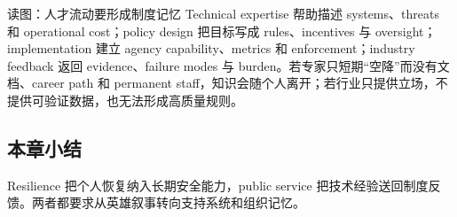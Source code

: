 
\begin{knowledgebox}{读图：人才流动要形成制度记忆}
Technical expertise 帮助描述 systems、threats 和 operational cost；policy design 把目标写成 rules、incentives 与 oversight；implementation 建立 agency capability、metrics 和 enforcement；industry feedback 返回 evidence、failure modes 与 burden。若专家只短期“空降”而没有文档、career path 和 permanent staff，知识会随个人离开；若行业只提供立场，不提供可验证数据，也无法形成高质量规则。
\end{knowledgebox}


\subsection{本章小结}

Resilience 把个人恢复纳入长期安全能力，public service 把技术经验送回制度反馈。两者都要求从英雄叙事转向支持系统和组织记忆。

